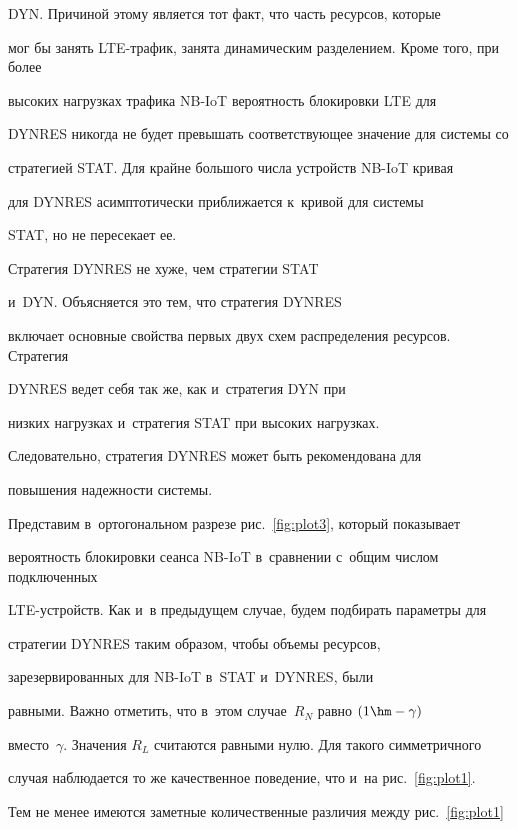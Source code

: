 {DYN}. Причиной этому является тот факт, что часть ресурсов, которые 


мог бы занять LTE-тра\-фик, занята динамическим разделением. Кроме того, при более 


высоких нагрузках трафика NB-IoT вероятность блокировки LTE для 


\mbox{DYNRES} никогда не будет превышать соответствующее значение для системы со 


стратегией {STAT}. Для крайне большого числа устройств NB-IoT кривая 


для \mbox{DYNRES} асимптотически приближается к~кривой для сис\-те\-мы 


 {STAT}, но не пересекает ее.





 Стратегия \mbox{DYNRES} не хуже, чем стратегии  {STAT} 


 и~DYN. Объясняется это тем, что стратегия \mbox{DYNRES} 


включает основные свойства первых двух схем распределения ресурсов. Стратегия 


\mbox{DYNRES} ведет себя так же, как и~стратегия {DYN} при 


низких нагрузках и~стратегия STAT при высоких нагрузках. 


Следовательно, стратегия \mbox{DYNRES} может быть рекомендована для 


повышения надежности сис\-темы.





Представим в~ортогональном разрезе рис.~\ref{fig:plot3}, который показывает 


вероятность блокировки сеанса NB-IoT в~сравнении с~общим числом подключенных 


LTE-устройств. Как и~в предыдущем случае, будем подбирать параметры для 


стратегии \mbox{DYNRES} таким образом, чтобы объемы ресурсов, 


зарезервированных для NB-IoT в~{STAT} и~\mbox{DYNRES}, были 


равными. Важно отметить, что в~этом случае~$R_{N}$ равно $(1\hm-\gamma)$ 


вместо~$\gamma$. Значения $R_{L}$ считаются равными нулю. Для такого симметричного 


случая  наблюдается то же качественное поведение, что и~на рис.~\ref{fig:plot1}. 


Тем не менее имеются заметные количественные различия между рис.~\ref{fig:plot1} 


